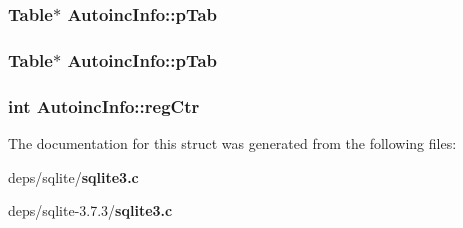 \subsubsection{\setlength{\rightskip}{0pt plus 5cm}\bf{Table}$\ast$ \bf{Autoinc\-Info::p\-Tab}}\label{structAutoincInfo_83c3077b51f377940bd5887dc9ef201d}


\subsubsection{\setlength{\rightskip}{0pt plus 5cm}\bf{Table}$\ast$ \bf{Autoinc\-Info::p\-Tab}}\label{structAutoincInfo_83c3077b51f377940bd5887dc9ef201d}


\subsubsection{\setlength{\rightskip}{0pt plus 5cm}int \bf{Autoinc\-Info::reg\-Ctr}}\label{structAutoincInfo_d603a7efe8fb89b0780c9f5bfaae3247}




The documentation for this struct was generated from the following files:\begin{CompactItemize}
\item 
deps/sqlite/\bf{sqlite3.c}\item 
deps/sqlite-3.7.3/\bf{sqlite3.c}\end{CompactItemize}
